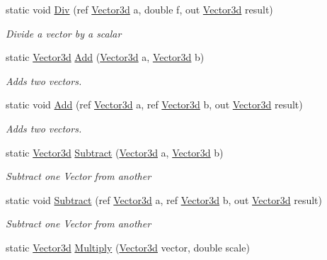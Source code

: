 \begin{DoxyCompactItemize}
static void \hyperlink{struct_open_t_k_1_1_vector3d_ae29ea2c48d8c832e9cbfd66a7a8e9ef9}{Div} (ref \hyperlink{struct_open_t_k_1_1_vector3d}{Vector3d} a, double f, out \hyperlink{struct_open_t_k_1_1_vector3d}{Vector3d} result)
\begin{DoxyCompactList}\small\item\em Divide a vector by a scalar \end{DoxyCompactList}\item 
static \hyperlink{struct_open_t_k_1_1_vector3d}{Vector3d} \hyperlink{struct_open_t_k_1_1_vector3d_a000813142e2eca31cd127cf8ef1ce10b}{Add} (\hyperlink{struct_open_t_k_1_1_vector3d}{Vector3d} a, \hyperlink{struct_open_t_k_1_1_vector3d}{Vector3d} b)
\begin{DoxyCompactList}\small\item\em Adds two vectors. \end{DoxyCompactList}\item 
static void \hyperlink{struct_open_t_k_1_1_vector3d_affeec46e718fdb8f8142980756a6e543}{Add} (ref \hyperlink{struct_open_t_k_1_1_vector3d}{Vector3d} a, ref \hyperlink{struct_open_t_k_1_1_vector3d}{Vector3d} b, out \hyperlink{struct_open_t_k_1_1_vector3d}{Vector3d} result)
\begin{DoxyCompactList}\small\item\em Adds two vectors. \end{DoxyCompactList}\item 
static \hyperlink{struct_open_t_k_1_1_vector3d}{Vector3d} \hyperlink{struct_open_t_k_1_1_vector3d_a72dba90498927eeedcd7c44bd353cbed}{Subtract} (\hyperlink{struct_open_t_k_1_1_vector3d}{Vector3d} a, \hyperlink{struct_open_t_k_1_1_vector3d}{Vector3d} b)
\begin{DoxyCompactList}\small\item\em Subtract one Vector from another \end{DoxyCompactList}\item 
static void \hyperlink{struct_open_t_k_1_1_vector3d_af4ccc73aca284e11959b1ff121f8fbc7}{Subtract} (ref \hyperlink{struct_open_t_k_1_1_vector3d}{Vector3d} a, ref \hyperlink{struct_open_t_k_1_1_vector3d}{Vector3d} b, out \hyperlink{struct_open_t_k_1_1_vector3d}{Vector3d} result)
\begin{DoxyCompactList}\small\item\em Subtract one Vector from another \end{DoxyCompactList}\item 
static \hyperlink{struct_open_t_k_1_1_vector3d}{Vector3d} \hyperlink{struct_open_t_k_1_1_vector3d_a7bf42bd9ec3f90548104af9ca8c9da4b}{Multiply} (\hyperlink{struct_open_t_k_1_1_vector3d}{Vector3d} vector, double scale)

\end{DoxyCompactItemize}
